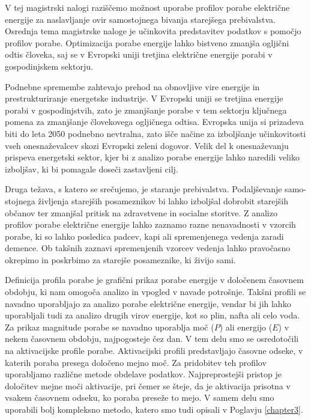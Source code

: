 \begin{sloabstract}
V tej magistrski nalogi raziščemo možnost uporabe profilov porabe električne energije za naslavljanje ovir samostojnega bivanja starejšega prebivalstva. Osrednja tema magistrske naloge je učinkovita predstavitev podatkov s pomočjo profilov porabe. Optimizacija porabe energije lahko bistveno zmanjša ogljični odtis človeka, saj se v Evropski uniji tretjina električne energije porabi v gospodinjskem sektorju. 

Podnebne spremembe zahtevajo prehod na obnovljive vire energije in prestrukturiranje energetske industrije. V Evropski uniji se tretjina energije porabi v gospodinjstvih, zato je zmanjšanje porabe v tem sektorju ključnega pomena za zmanjšanje človekovega ogljičnega odtisa. Evropska unija si prizadeva biti do leta 2050 podnebno nevtralna, zato išče načine za izboljšanje učinkovitosti vseh onesnaževalcev skozi Evropski zeleni dogovor. Velik del k onesnaževanju prispeva energetski sektor, kjer bi z analizo porabe energije lahko naredili veliko izboljšav, ki bi pomagale doseči zastavljeni cilj. 

Druga težava, s katero se srečujemo, je staranje prebivalstva. Podaljševanje samo-stojnega življenja starejših posameznikov bi lahko izboljšal dobrobit starejših občanov ter zmanjšal pritisk na zdravstvene in socialne storitve. Z analizo profilov porabe električne energije lahko zaznamo razne nenavadnosti v vzorcih porabe, ki so lahko posledica padcev, kapi ali spremenjenega vedenja zaradi demence. Ob takšnih zaznavi spremenjenih vzorcev vedenja lahko pravočasno okrepimo in poskrbimo za starejše posameznike, ki živijo sami.  

Definicija profila porabe je grafični prikaz porabe energije v določenem časovnem obdobju, ki nam omogoča analizo in vpogled v navade potrošnje. Takšni profili se navadno uporabljajo za analizo porabe električne energije, vendar bi jih lahko uporabljali tudi za analizo drugih virov energije, kot so plin, nafta ali celo voda. Za prikaz magnitude porabe se navadno uporablja moč ($P$) ali energijo ($E$) v nekem časovnem obdobju, najpogosteje čez dan. V tem delu smo se osredotočili na aktivacijske profile porabe. Aktivacijski profili predstavljajo časovne odseke, v katerih poraba presega določeno mejno moč. Za pridobitev teh profilov uporabljamo različne metode obdelave podatkov. Najpreprostejši pristop je določitev mejne moči aktivacije, pri čemer se šteje, da je aktivacija prisotna v vsakem časovnem odseku, ko poraba preseže to mejo. V samem delu smo uporabili bolj kompleksno metodo, katero smo tudi opisali v Poglavju \ref{chapter3}. 


\end{sloabstract}
